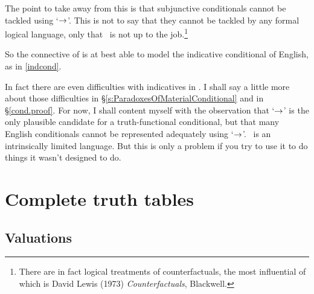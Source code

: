 The point to take away from this is that subjunctive conditionals cannot be tackled using `$\rightarrow$'. This is not to say that they cannot be tackled by any formal logical language, only that \TFL\ is not up to the job.\footnote{There are in fact logical treatments of counterfactuals, the most influential of which is David Lewis (1973) \emph{Counterfactuals}, Blackwell.}

So the \eif connective of \TFL is at best able to model the indicative conditional of English, as in \ref{indcond}.

In fact there are even difficulties with indicatives in \TFL. I shall say a little more about those difficulties in §\ref{s:ParadoxesOfMaterialConditional} and in §\ref{cond.proof}. For now, I shall content myself with the observation that `$\rightarrow$' is the only plausible candidate for a truth-functional conditional, but that many English conditionals cannot be represented adequately using `$\rightarrow$'. \TFL\ is an intrinsically limited language. But this is only a problem if you try to use it to do things it wasn't designed to do.




\chapter{Complete truth tables}\label{s:CompleteTruthTables}

\section{Valuations}\label{s:valuations}

